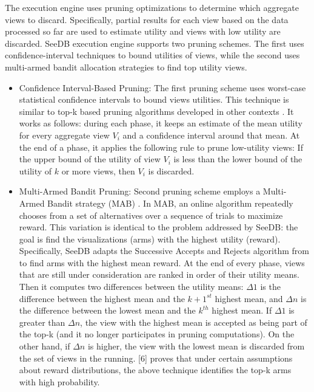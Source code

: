 The execution engine uses pruning optimizations to determine 
which aggregate views to discard. Specifically, partial results for each 
view based on the data processed so far are used to estimate utility and views 
with low utility are discarded. SeeDB execution engine supports two pruning schemes. 
The first uses confidence-interval techniques to bound utilities of views, while the second 
uses multi-armed bandit allocation strategies to find top utility views.\\
 \begin{itemize}
\item {Confidence Interval-Based Pruning:} The first pruning scheme uses worst-case statistical confidence intervals to bound views utilities. 
 This technique is similar to top-k based pruning algorithms developed in other contexts \cite{serfling1974probability}. 
 It works as follows: during each phase, 
 it keeps an estimate of the mean utility for every aggregate view $V_i$ and a confidence 
 interval around that mean. At the end of a phase, it applies the following rule to 
 prune low-utility views: If the upper bound of the utility of view $V_i$ is less than the lower bound 
 of the utility of $k$ or more views, then $V_i$ is discarded. 
\item {Multi-Armed Bandit Pruning:} Second pruning scheme employs a Multi-Armed Bandit strategy (MAB)
\cite{DBLP:journals/pvldb/VartakMPP14,DBLP:conf/icml/BubeckWV13}. 
In MAB, an online algorithm repeatedly chooses from a set of alternatives over 
a sequence of trials to maximize reward. 
This variation is identical to the problem addressed by SeeDB: the goal is find the 
visualizations (arms) with the highest utility (reward). 
Specifically, SeeDB adapts the Successive Accepts and Rejects algorithm from \cite{DBLP:conf/icml/BubeckWV13}
to find arms with the highest mean reward. At the end of every 
phase, views that are still under consideration are ranked in order of their 
utility means. Then it computes two differences between the utility means: $\Delta {1} $ is the difference 
between the highest mean and the $k + 1^{st}$ highest mean, and $\Delta{n}$ is the difference between 
the lowest mean and the ${k}^{th}$ highest mean. If $\Delta {1}$ is greater than $ \Delta{n}$, the view with the 
highest mean is accepted as being part of the top-k (and it no longer participates in pruning computations). 
On the other hand, if $ \Delta{n}$ is higher, the view with the lowest mean is discarded from the set of 
views in the running. [6] proves that under certain assumptions about reward distributions, 
the above technique identifies the top-k arms with high probability.
 
\end{itemize}
 
